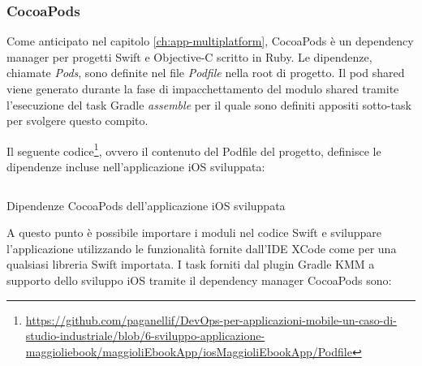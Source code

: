 \subsubsection*{CocoaPods}
Come anticipato nel capitolo \ref{ch:app-multiplatform}, 
CocoaPods è un dependency manager per progetti Swift e Objective-C scritto in Ruby. 
Le dipendenze, 
chiamate \textit{Pods}, 
sono definite nel file \textit{Podfile} nella root di progetto. 
Il pod shared viene generato durante la fase di impacchettamento del modulo shared tramite l’esecuzione del task Gradle \textit{assemble} per il quale sono definiti appositi sotto-task per svolgere questo compito.

Il seguente codice\footnote{\href{https://github.com/paganellif/DevOps-per-applicazioni-mobile-un-caso-di-studio-industriale/blob/6-sviluppo-applicazione-maggioliebook/maggioliEbookApp/iosMaggioliEbookApp/Podfile}{https://github.com/paganellif/DevOps-per-applicazioni-mobile-un-caso-di-studio-industriale/blob/6-sviluppo-applicazione-maggioliebook/maggioliEbookApp/iosMaggioliEbookApp/Podfile}}, 
ovvero il contenuto del Podfile del progetto, 
definisce le dipendenze incluse nell'applicazione iOS sviluppata:

\begin{listing}[H]
    \inputminted{ruby}{code/Podfile}
    \caption{Dipendenze CocoaPods dell'applicazione iOS sviluppata}
\end{listing}

A questo punto è possibile importare i moduli nel codice Swift e sviluppare l'applicazione utilizzando le funzionalità fornite dall'IDE XCode come per una qualsiasi libreria Swift importata. 
I task forniti dal plugin Gradle KMM a supporto dello sviluppo iOS tramite il dependency manager CocoaPods sono:

